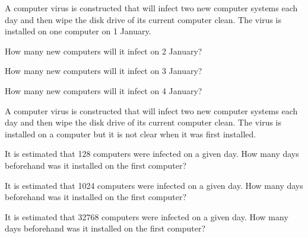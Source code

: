 
\begin{problem}
\item A computer virus is constructed that will infect two new
  computer systems each day and then wipe the disk drive of its
  current computer clean.  The virus is installed on one computer on
  1 January.
  \begin{subproblem}
  \item How many new computers will it infect on 2 January?
    \vfill
  \item How many new computers will it infect on 3 January?
    \vfill
  \item How many new computers will it infect on 4 January?
    \vfill
  \end{subproblem}
\item A computer virus is constructed that will infect two new
  computer systems each day and then wipe the disk drive of its
  current computer clean.  The virus is installed on a computer but it
  is not clear when it was first installed.
  \begin{subproblem}
  \item It is estimated that 128 computers were infected on a given
    day. How many days beforehand was it installed on the first computer?
    \vfill
  \item It is estimated that 1024 computers were infected on a given
    day. How many days beforehand was it installed on the first computer?
    \vfill
  \item It is estimated that 32768 computers were infected on a given
    day. How many days beforehand was it installed on the first computer?
    \vfill
  \end{subproblem}
\end{problem}


